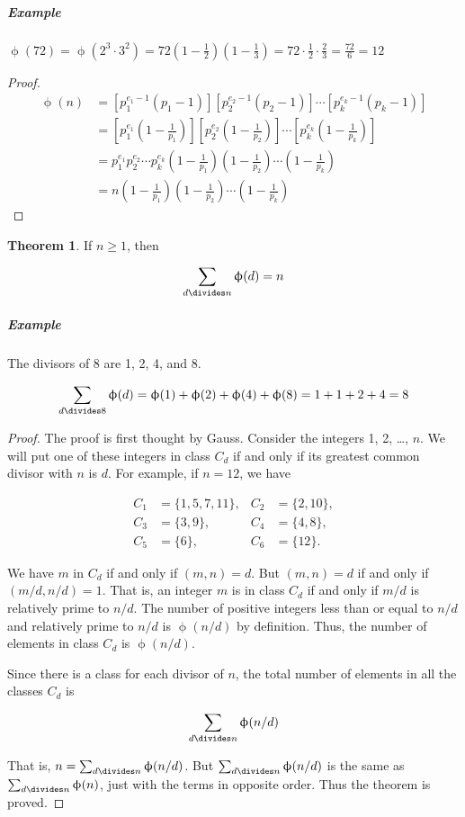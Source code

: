 \documentclass{article}
\theoremstyle{definition} %
\newtheorem{theorem}{Theorem}[section] %
\theoremstyle{definition}
\theoremstyle{definition}
\newcommand{\tot}{\upphi}
\theoremstyle{definition}
\begin{document}
  \subparagraph{Example} $\tot(72) = \tot(2^3 \cdot 3^2) = 72(1 - \frac{1}{2})(1 - \frac{1}{3}) = 72\cdot\frac{1}{2}\cdot\frac{2}{3}
  = \frac{72}{6} = 12$
  
  \begin{proof}
    \begin{align*}
      \tot(n) &= \left[p_1^{e_1-1}(p_1-1)\right] \left[p_2^{e_2-1}(p_2-1)\right] \cdots \left[p_k^{e_k-1}(p_k-1)\right] \\
        &= \left[p_1^{e_1}\left(1-\frac{1}{p_1}\right)\right] \left[p_2^{e_2}\left(1-\frac{1}{p_2}\right)\right] \cdots \left[p_k^{e_k}\left(1-\frac{1}{p_k}\right)\right] \\
        &= p_1^{e_1} p_2^{e_2} \cdots p_k^{e_k} \left( 1 - \frac{1}{p_1}\right) \left(1 - \frac{1}{p_2}\right)\cdots\left(1 - \frac{1}{p_k}\right) \\
        &= n\left( 1 - \frac{1}{p_1}\right) \left(1 - \frac{1}{p_2}\right)\cdots\left(1 - \frac{1}{p_k}\right)
    \end{align*}
  \end{proof}
  
  \begin{theorem}
    If $n \geq 1$, then
    
    \[ \sum_{d \divides n}\tot(d) = n \]
  \end{theorem}
  
  \subparagraph{Example} The divisors of 8 are 1, 2, 4, and 8.
  
  \[ \sum_{d \divides 8}\tot(d) = \tot(1) + \tot(2) + \tot(4) + \tot(8) = 1 + 1 + 2 + 4 = 8 \]
  
  \begin{proof}
    The proof is first thought by Gauss. Consider the integers 1, 2, \dots, $n$. We will put one of
    these integers in class $C_d$ if and only if its greatest common divisor with $n$ is $d$.
    For example, if $n = 12$, we have
    
    \begin{align*}
      C_1 &= \{1, 5, 7, 11\},& C_2 &= \{2, 10\}, \\
      C_3 &= \{3, 9\},& C_4 &= \{4, 8\}, \\
      C_5 &= \{6\},& C_6 &= \{12\}.
    \end{align*}
    
    We have $m$ in $C_d$ if and only if $(m, n) = d$. But $(m, n) = d$ if and only if
    $(m/d, n/d) = 1$. That is, an integer $m$ is in class $C_d$ if and only if $m/d$ is
    relatively prime to $n/d$. The number of positive integers less than or equal to
    $n/d$ and relatively prime to $n/d$ is $\tot(n/d)$ by definition. Thus, the number
    of elements in class $C_d$ is $\tot(n/d)$.
    
    Since there is a class for each divisor of $n$, the total number of elements in all
    the classes $C_d$ is
    
    \[ \sum_{d\divides n}\tot(n/d) \]
    
    That is, $n = \sum_{d\divides n}\tot(n/d)$. But $\sum_{d\divides n}\tot(n/d)$ is
    the same as $\sum_{d\divides n}\tot(n)$, just with the terms in opposite order.
    Thus the theorem is proved.
  \end{proof}
  
\end{document}
